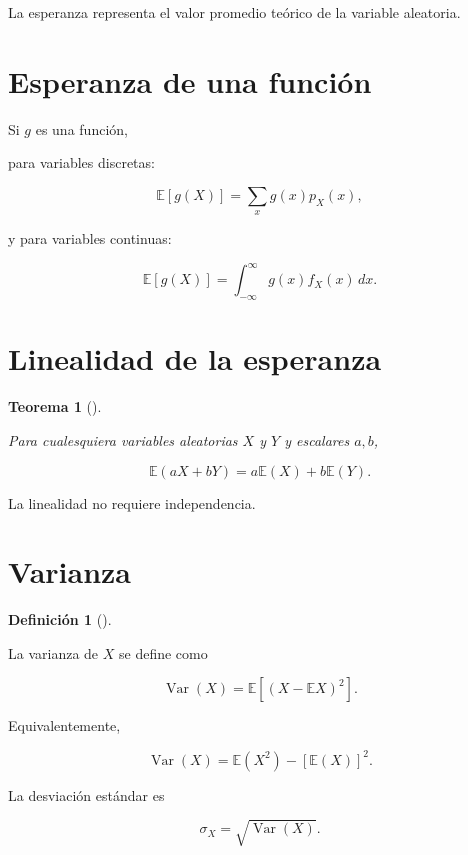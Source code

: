 \documentclass[
  spanish,
  11pt,
  letterpaper,
  DIV=11,
  numbers=noendperiod]{scrreprt}
\theoremstyle{definition}
\newtheorem{definition}{Definición}[chapter]
\theoremstyle{plain}
\newtheorem{theorem}{Teorema}[chapter]
\theoremstyle{definition}
\theoremstyle{remark}
\begin{document}
La esperanza representa el valor promedio teórico de la variable
aleatoria.

\section{Esperanza de una función}\label{esperanza-de-una-funciuxf3n}

Si \(g\) es una función,

para variables discretas:

\[
\mathbb{E}[g(X)]
=
\sum_x g(x)p_X(x),
\]

y para variables continuas:

\[
\mathbb{E}[g(X)]
=
\int_{-\infty}^{\infty}
g(x)f_X(x)\,dx.
\]

\section{Linealidad de la esperanza}\label{linealidad-de-la-esperanza}

\begin{theorem}[]\protect\hypertarget{thm-linealidad-esperanza}{}\label{thm-linealidad-esperanza}

Para cualesquiera variables aleatorias \(X\) y \(Y\) y escalares
\(a,b\),

\[
\mathbb{E}(aX+bY)
=
a\mathbb{E}(X)
+
b\mathbb{E}(Y).
\]

\end{theorem}

La linealidad no requiere independencia.

\section{Varianza}\label{varianza}

\begin{definition}[]\protect\hypertarget{def-varianza}{}\label{def-varianza}

La varianza de \(X\) se define como

\[
\operatorname{Var}(X)
=
\mathbb{E}
\left[
(X-\mathbb{E}X)^2
\right].
\]

\end{definition}

Equivalentemente,

\[
\operatorname{Var}(X)
=
\mathbb{E}(X^2)
-
[\mathbb{E}(X)]^2.
\]

La desviación estándar es

\[
\sigma_X
=
\sqrt{
\operatorname{Var}(X)
}.
\]
\end{document}
